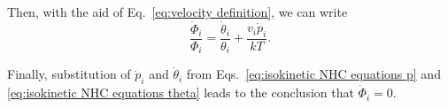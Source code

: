\documentclass[
aip,
jcp,
reprint,
]{revtex4-1}
\begin{document}
Then, with the aid of Eq.~\eqref{eq:velocity definition}, we can write
\begin{equation}
\frac{\dot{\Phi}_i}{\Phi_i} = \frac{\dot{\theta}_i}{\theta_i} + \frac{v_i \dot{p}_i}{kT}.
\end{equation}

Finally, substitution of $ \dot{p}_i$ and $\dot{\theta}_i$ from Eqs.~\eqref{eq:isokinetic NHC equations p} and \eqref{eq:isokinetic NHC equations theta} leads to the conclusion that $\dot{\Phi}_i = 0$.


\end{document}

